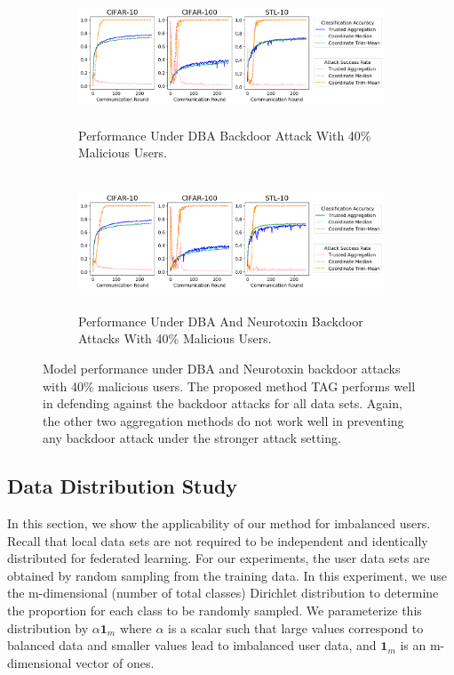 \documentclass{article} %
\begin{document}
\begin{figure}[htp]
\centering
  \begin{subfigure}{\textwidth}
  \centering
    \includegraphics[height=4cm, width=\textwidth]{make_article/make_visuals/visuals/accuracy--n_malicious4--dba1--beta0.2--d_scale.png}
    \caption{\footnotesize Performance Under DBA Backdoor Attack With 40\% Malicious Users.}
  \end{subfigure}%

  \begin{subfigure}{\textwidth}
  \centering
    \includegraphics[height=4cm, width=\textwidth]{make_article/make_visuals/visuals/accuracy--n_malicious4--dba1--beta0.2--d_scale--neuro_p0.1.png}
    \caption{\footnotesize Performance Under DBA And Neurotoxin Backdoor Attacks With 40\% Malicious Users.}
  \end{subfigure}%
\caption{\footnotesize Model performance under DBA and Neurotoxin backdoor attacks with 40\% malicious users. The proposed method TAG performs well in defending against the backdoor attacks for all data sets. Again, the other two aggregation methods do not work well in preventing any backdoor attack under the stronger attack setting.}
\label{fig: accuracy--n_malicious4}
\end{figure}


%
\subsection{Data Distribution Study}

In this section, we show the applicability of our method for imbalanced users. Recall that local data sets are not required to be independent and identically distributed for federated learning. For our experiments, the user data sets are obtained by random sampling from the training data. In this experiment, we use the m-dimensional (number of total classes) Dirichlet distribution to determine the proportion for each class to be randomly sampled. We parameterize this distribution by $\alpha \mathbf{1}_m$ where $\alpha$ is a scalar such that large values correspond to balanced data and smaller values lead to imbalanced user data, and $\mathbf{1}_m$ is an m-dimensional vector of ones.
\end{document}

